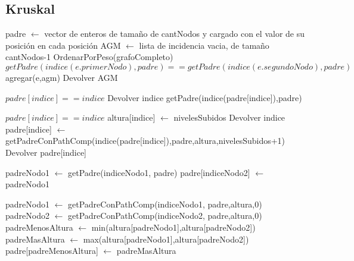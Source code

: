 \documentclass[8pt,a4paper]{article}
\begin{document}
\subsection{Kruskal}
\begin{codebox}
		\li padre $\gets$ vector de enteros de tamaño de cantNodos y cargado con el valor de su posición en cada posición
		\li AGM $\gets$ lista de incidencia vacia, de tamaño cantNodos-1
		\li OrdenarPorPeso(grafoCompleto)
		\li {} 
			\li \Do
			\li \If $getPadre(indice(e.primerNodo), padre) == getPadre(indice(e.segundoNodo),padre)$
				\li \Then agregar(e,agm)
					\End
				\End
	\li Devolver AGM
\end{codebox}

\begin{codebox}
\li \If $padre[indice] == indice$ 
	\li \Then
		\li Devolver indice
	\li \Else
		\li getPadre(indice(padre[indice]),padre)
	\li \End
\end{codebox}


\begin{codebox}
\li \If $padre[indice] == indice$
	\li \Then
		\li altura[indice] $\gets$ nivelesSubidos
		\li Devolver indice
	\li \Else
		\li padre[indice] $\gets$ getPadreConPathComp(indice(padre[indice]),padre,altura,nivelesSubidos+1)
		\li Devolver padre[indice]
	\li \End
\end{codebox}


\begin{codebox}
	\li padreNodo1 $\gets$ getPadre(indiceNodo1, padre)
	\li padre[indiceNodo2] $\gets$ padreNodo1
\end{codebox}

\begin{codebox}
\li padreNodo1 $\gets$ getPadreConPathComp(indiceNodo1, padre,altura,0)
\li padreNodo2 $\gets$ getPadreConPathComp(indiceNodo2, padre,altura,0)
\li padreMenosAltura $\gets$ min(altura[padreNodo1],altura[padreNodo2])
\li padreMasAltura $\gets$ max(altura[padreNodo1],altura[padreNodo2])
\li padre[padreMenosAltura] $\gets$ padreMasAltura
\end{codebox}
\end{document}
